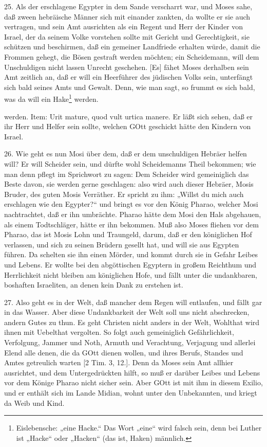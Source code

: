 25. Als der erschlagene Egypter in dem Sande verscharrt war, und Moses sahe, daß zween hebräische Männer sich mit einander zankten, da wollte er sie auch vertragen, und sein Amt ausrichten als ein Regent und Herr der Kinder von Israel, der da seinem Volke vorstehen sollte mit Gericht und Gerechtigkeit, sie schützen und beschirmen, daß ein gemeiner Landfriede erhalten würde, damit die Frommen gehegt, die Bösen gestraft werden möchten; ein Scheidemann, will dem Unschuldigen nicht lassen Unrecht geschehen. [Es] fähet Moses derhalben sein Amt zeitlich an, daß er will ein Heerführer des jüdischen Volks sein, unterfängt sich bald seines Amts und Gewalt. Denn, wie man sagt, so frummt es sich bald, was da will ein Hake\footnote{Eislebensche: „eine Hacke.“ Das Wort „eine“ wird falsch sein, denn bei Luther ist „Hacke“ oder „Hacken“ (das ist, Haken) männlich.} werden.

werden. Item: Urit mature, quod vult urtica manere. Er läßt sich sehen, daß er ihr Herr und Helfer sein sollte, welchen GOtt geschickt hätte den Kindern von Israel.

26. Wie geht es nun Mosi über dem, daß er dem unschuldigen Hebräer helfen will? Er will Scheider sein, und dürfte wohl Scheidemanns Theil bekommen; wie man denn pflegt im Sprichwort zu sagen: Dem Scheider wird gemeiniglich das Beste davon, sie werden gerne geschlagen: also wird auch dieser Hebräer, Mosis Bruder, des guten Mosis Verräther. Er spricht zu ihm: „Willst du mich auch erschlagen wie den Egypter?“ und bringt es vor den König Pharao, welcher Mosi nachtrachtet, daß er ihn umbrächte. Pharao hätte dem Mosi den Hals abgehauen, als einem Todtschläger, hätte er ihn bekommen. Muß also Moses fliehen vor dem Pharao, das ist Mosis Lohn und Traungeld, darum, daß er den königlichen Hof verlassen, und sich zu seinen Brüdern gesellt hat, und will sie aus Egypten führen. Da schelten sie ihn einen Mörder, und kommt durch sie in Gefahr Leibes und Lebens. Er wollte bei den abgöttischen Egyptern in großem Reichthum und Herrlichkeit nicht bleiben am königlichen Hofe, und fällt unter die undankbaren, boshaften Israeliten, an denen kein Dank zu erstehen ist.

27. Also geht es in der Welt, daß mancher dem Regen will entlaufen, und fällt gar in das Wasser. Aber diese Undankbarkeit der Welt soll uns nicht abschrecken, andern Gutes zu thun. Es geht Christen nicht anders in der Welt, Wohlthat wird ihnen mit Uebelthat vergolten. So folgt auch gemeiniglich Gefährlichkeit, Verfolgung, Jammer und Noth, Armuth und Verachtung, Verjagung und allerlei Elend alle denen, die da GOtt dienen wollen, und ihres Berufs, Standes und Amtes getreulich warten [2 Tim. 3, 12.]. Denn da Moses sein Amt allhier ausrichtet, und dem Untergedrückten hilft, so muß er darüber Leibes und Lebens vor dem Könige Pharao nicht sicher sein. Aber GOtt ist mit ihm in diesem Exilio, und er enthält sich im Lande Midian, wohnt unter den Unbekannten, und kriegt da Weib und Kind.

